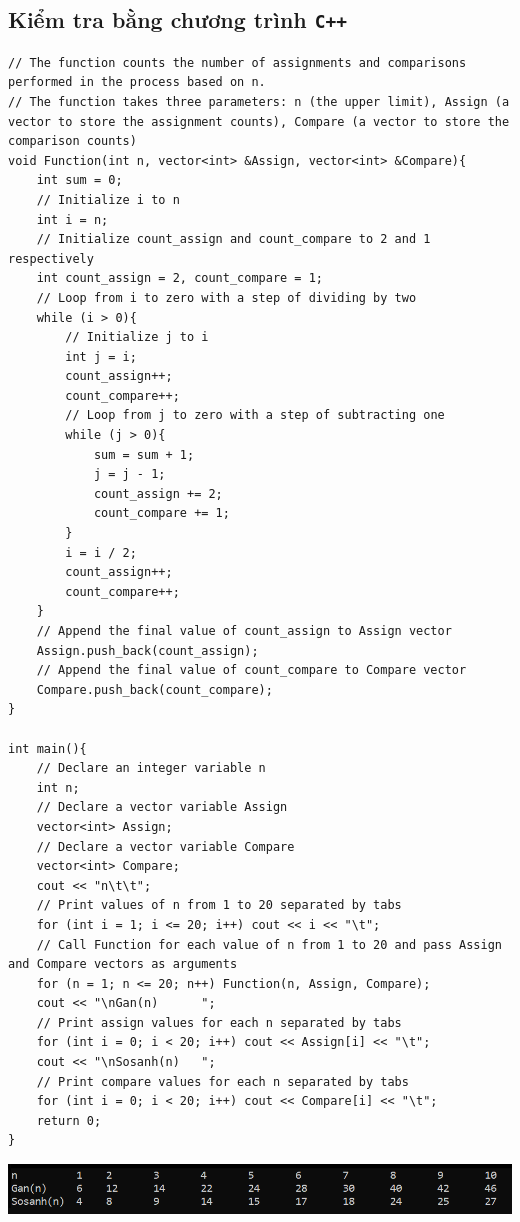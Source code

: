 \documentclass[12pt, a4paper]{article}
\begin{document}
\subsection{Kiểm tra bằng chương trình \texttt{C++}}
\begin{lstlisting}
// The function counts the number of assignments and comparisons performed in the process based on n.
// The function takes three parameters: n (the upper limit), Assign (a vector to store the assignment counts), Compare (a vector to store the comparison counts)
void Function(int n, vector<int> &Assign, vector<int> &Compare){
    int sum = 0;
    // Initialize i to n
    int i = n;
    // Initialize count_assign and count_compare to 2 and 1 respectively
    int count_assign = 2, count_compare = 1;
    // Loop from i to zero with a step of dividing by two
    while (i > 0){
        // Initialize j to i
        int j = i;
        count_assign++;
        count_compare++;
        // Loop from j to zero with a step of subtracting one 
        while (j > 0){
            sum = sum + 1;
            j = j - 1;
            count_assign += 2;
            count_compare += 1;
        }
        i = i / 2;
        count_assign++;
        count_compare++;
    }
    // Append the final value of count_assign to Assign vector 
    Assign.push_back(count_assign);
    // Append the final value of count_compare to Compare vector
    Compare.push_back(count_compare);  
}

int main(){
    // Declare an integer variable n
    int n;
    // Declare a vector variable Assign
    vector<int> Assign;
    // Declare a vector variable Compare
    vector<int> Compare;  
    cout << "n\t\t";
    // Print values of n from 1 to 20 separated by tabs
    for (int i = 1; i <= 20; i++) cout << i << "\t";
    // Call Function for each value of n from 1 to 20 and pass Assign and Compare vectors as arguments
    for (n = 1; n <= 20; n++) Function(n, Assign, Compare);  
    cout << "\nGan(n)      ";
    // Print assign values for each n separated by tabs 
    for (int i = 0; i < 20; i++) cout << Assign[i] << "\t"; 
    cout << "\nSosanh(n)   ";
    // Print compare values for each n separated by tabs
    for (int i = 0; i < 20; i++) cout << Compare[i] << "\t"; 
    return 0;
}
\end{lstlisting}
\begin{center}
\includegraphics[width=1\textwidth]{img/terminal13a.png}
\end{center}
\end{document}
